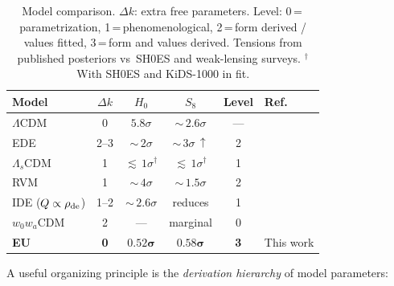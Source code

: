 \documentclass[a4paper,fleqn]{cas-dc}
\begin{document}
\begin{table}[t]
\caption{Model comparison. $\Delta k$: extra free
parameters. Level: 0\,=\,parametrization,
1\,=\,phenomenological, 2\,=\,form derived / values
fitted, 3\,=\,form and values derived. Tensions
from published posteriors vs~SH0ES and
weak-lensing surveys.
$^\dagger$With SH0ES and KiDS-1000 in fit.}
\label{tab:model_comparison}
\begin{tabular}{p{1.8cm}ccccl}
Model & $\Delta k$ & $H_0$ & $S_8$ & Level & Ref. \\
\hline
$\Lambda$CDM
  & 0 & $5.8\sigma$ & ${\sim}\,2.6\sigma$ & --- &
  \cite{planck2018} \\
EDE
  & 2--3 & ${\sim}\,2\sigma$ &
  ${\sim}\,3\sigma\,\uparrow$ & 2 &
  \cite{poulin2019_ede} \\
$\Lambda_s$CDM
  & 1 & ${\lesssim}\,1\sigma^{\dagger}$ &
  ${\lesssim}\,1\sigma^{\dagger}$ & 1 &
  \cite{akarsu2023} \\
RVM
  & 1 & ${\sim}\,4\sigma$ &
  ${\sim}\,1.5\sigma$ & 2 &
  \cite{sola2017_rvm} \\
IDE ($Q \propto \rho_{\rm de}$)
  & 1--2 & ${\sim}\,2.6\sigma$ & reduces & 1 &
  \cite{divalentino2020} \\
$w_0 w_a$CDM
  & 2 & --- & marginal & 0 &
  \cite{desi_dr2_2025} \\
\textbf{EU}
  & \textbf{0} & $\mathbf{0.52\sigma}$ &
  $\mathbf{0.58\sigma}$ & \textbf{3}
  & This work \\
\end{tabular}
\end{table}

A useful organizing principle is the
\textit{derivation hierarchy} of model parameters:
\end{document}
